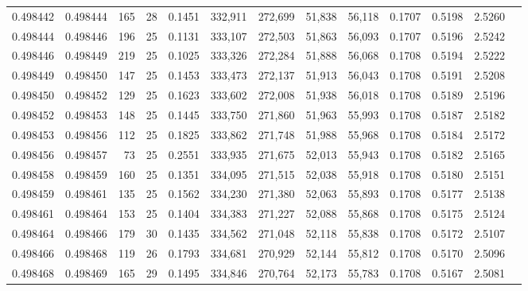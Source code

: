 \begin{tabular}{rrrrrrrrrrrrr}
0.498442 & 0.498444 & 165 &  28 &                                     0.1451 & 332,911 & 272,699 &  51,838 &  56,118 & 0.1707 & 0.5198 & 2.5260 \\
0.498444 & 0.498446 & 196 &  25 &                                     0.1131 & 333,107 & 272,503 &  51,863 &  56,093 & 0.1707 & 0.5196 & 2.5242 \\
0.498446 & 0.498449 & 219 &  25 &                                     0.1025 & 333,326 & 272,284 &  51,888 &  56,068 & 0.1708 & 0.5194 & 2.5222 \\
0.498449 & 0.498450 & 147 &  25 &                                     0.1453 & 333,473 & 272,137 &  51,913 &  56,043 & 0.1708 & 0.5191 & 2.5208 \\
0.498450 & 0.498452 & 129 &  25 &                                     0.1623 & 333,602 & 272,008 &  51,938 &  56,018 & 0.1708 & 0.5189 & 2.5196 \\
0.498452 & 0.498453 & 148 &  25 &                                     0.1445 & 333,750 & 271,860 &  51,963 &  55,993 & 0.1708 & 0.5187 & 2.5182 \\
0.498453 & 0.498456 & 112 &  25 &                                     0.1825 & 333,862 & 271,748 &  51,988 &  55,968 & 0.1708 & 0.5184 & 2.5172 \\
0.498456 & 0.498457 &  73 &  25 &                                     0.2551 & 333,935 & 271,675 &  52,013 &  55,943 & 0.1708 & 0.5182 & 2.5165 \\
0.498458 & 0.498459 & 160 &  25 &                                     0.1351 & 334,095 & 271,515 &  52,038 &  55,918 & 0.1708 & 0.5180 & 2.5151 \\
0.498459 & 0.498461 & 135 &  25 &                                     0.1562 & 334,230 & 271,380 &  52,063 &  55,893 & 0.1708 & 0.5177 & 2.5138 \\
0.498461 & 0.498464 & 153 &  25 &                                     0.1404 & 334,383 & 271,227 &  52,088 &  55,868 & 0.1708 & 0.5175 & 2.5124 \\
0.498464 & 0.498466 & 179 &  30 &                                     0.1435 & 334,562 & 271,048 &  52,118 &  55,838 & 0.1708 & 0.5172 & 2.5107 \\
0.498466 & 0.498468 & 119 &  26 &                                     0.1793 & 334,681 & 270,929 &  52,144 &  55,812 & 0.1708 & 0.5170 & 2.5096 \\
0.498468 & 0.498469 & 165 &  29 &                                     0.1495 & 334,846 & 270,764 &  52,173 &  55,783 & 0.1708 & 0.5167 & 2.5081 \\

\end{tabular}
